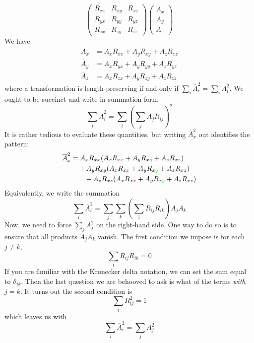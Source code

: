 \documentclass[a4paper]{article}
\begin{document}
\begin{enumerate}[label=(\alph*)]
\[\begin{pmatrix}
			R_{xx} & R_{xy} & R_{xz} \\
			R_{yx} & R_{yy} & R_{yz} \\
			R_{zx} & R_{zy} & R_{zz}
		\end{pmatrix}
		\begin{pmatrix}
			A_{x} \\
			A_{y} \\
			A_{z}
		\end{pmatrix}
	\]
	We have
	\begin{align*}
		\overline{A}_{x} & = A_{x}R_{xx} + A_{y}R_{xy} + A_{z}R_{xz} \\
		\overline{A}_{y} & = A_{x}R_{yx} + A_{y}R_{yy} + A_{z}R_{yz} \\ 
		\overline{A}_{z} & = A_{x}R_{zx} + A_{y}R_{zy} + A_{z}R_{zz}
	\end{align*}
where a transformation is length-preserving if and only if \( \sum_{i}\overline{A}^{2}_i = \sum_{i}A^{2}_{i} \). We ought to be succinct and write in summation form
\[
	\sum_{i}\overline{A}^{2}_{i} = \sum_{i}\!\left( \sum_{j}A_{j}R_{ij} \right)^{2}
\]
It is rather tedious to evaluate these quantities, but writing \( \overline{A}^{2}_{x} \) out identifies the pattern:
	\begin{align*}
		\overline{A}^{2}_{x} & = A_{x}R_{xx} \!\left( A_{x}R_{x\textcolor{red}{x}} + A_{y}R_{x\textcolor{green}{y}} + A_{z}R_{x\textcolor{blue}{z}} \right) \\
				     & \quad + A_{y}R_{xy} \!\left( A_{x}R_{x\textcolor{red}{x}} + A_{y}R_{x\textcolor{green}{y}} + A_{z}R_{x\textcolor{blue}{z}} \right) \\
				     & \qquad + A_{z}R_{xz} \!\left( A_{x}R_{x\textcolor{red}{x}} + A_{y}R_{x\textcolor{green}{y}} + A_{z}R_{x\textcolor{blue}{z}} \right)
	\end{align*}
	Equivalently, we write the summation
	\[
		\sum_{i}\overline{A}^{2}_{i} = \sum_{j}\sum_{k}\!\left( \sum_{i} R_{ij}R_{ik} \right)A_{j}A_{k}
	\]
	Now, we need to force \( \sum_{j}A^{2}_{j} \) on the right-hand side. One way to do so is to ensure that all products \( A_{j}A_{k} \) vanish. The first condition we impose is for each \( j \neq k \),
	\[
		\sum_{i}R_{ij}R_{ik} = 0
	\]
	If you are familiar with the Kronecker delta notation, we can set the sum equal to \( \delta_{jk} \). Then the last question we are behooved to ask is what of the terms \textit{with} \( j = k \). It turns out the second condition is
	\[
		 \sum_{i}R^{2}_{ij} = 1
	\]
	which leaves us with
	\[
		\sum_{i}\overline{A}^{2}_{i} = \sum_{j}A^{2}_{j}
	\]
\end{enumerate}
\end{document}
